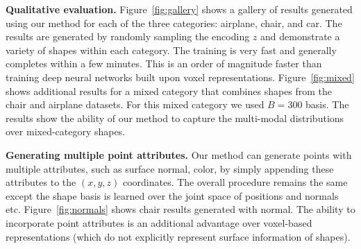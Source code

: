 
\vspace{12pt}
\noindent \textbf{Qualitative evaluation.} Figure~\ref{fig:gallery} shows a gallery of results generated using our method for each of the three categories: airplane, chair, and car. The results are generated by randomly sampling the encoding $z$ and demonstrate a variety of shapes within each category. The training is very fast and generally completes within a few minutes. This is an order of magnitude faster than training deep neural networks built upon voxel representations. Figure~\ref{fig:mixed} shows additional results for a mixed category that combines shapes from the chair and airplane datasets. For this mixed category we used $B=300$ basis. The results show the ability of our method to capture the multi-modal distributions over mixed-category shapes.

\vspace{12pt}
\noindent \textbf{Generating multiple point attributes.} Our method can generate points with multiple attributes, such as surface normal, color, by simply appending these attributes to the $(x,y,z)$ coordinates. The overall procedure remains the same except the shape basis is learned over the joint space of positions and normals etc. Figure~\ref{fig:normals} shows chair results generated with normal. The ability to incorporate point attributes is an additional advantage over voxel-based representations (which do not explicitly represent surface information of shapes).


